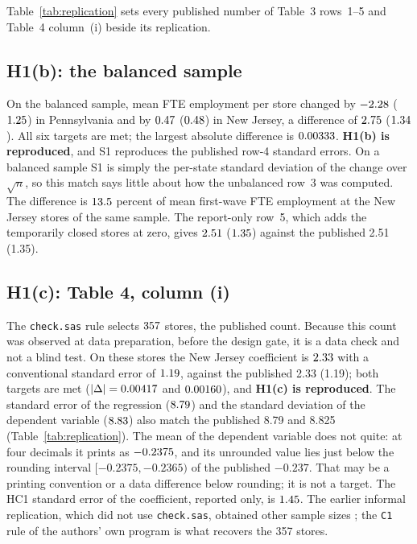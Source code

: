 \documentclass[11pt]{article}
\begin{document}
Table~\ref{tab:replication} sets every published number of Table~3 rows~1--5 and Table~4
column~(i) beside its replication.

\subsection{H1(b): the balanced sample}

On the balanced sample, mean FTE employment per store changed by $-2.28$
($1.25$) in Pennsylvania and by $0.47$ ($0.48$)
in New Jersey, a difference of $2.75$ ($1.34$). All six targets are
met; the largest absolute difference is $0.00333$. \textbf{H1(b) is reproduced}, and
S1 reproduces the published row-4 standard errors. On a balanced sample S1 is simply the
per-state standard deviation of the change over $\sqrt n$, so this match says little about
how the unbalanced row~3 was computed. The difference is $13.5$ percent of
mean first-wave FTE employment at the New Jersey stores of the same sample. The report-only
row~5, which adds the temporarily closed stores at zero, gives $2.51$ ($1.35$)
against the published 2.51 (1.35).

\subsection{H1(c): Table 4, column (i)}

The \texttt{check.sas} rule selects $357$ stores, the published count. Because this count
was observed at data preparation, before the design gate, it is a data check and not a blind
test. On these stores the New Jersey coefficient is $2.33$ with a conventional standard
error of $1.19$, against the published 2.33 (1.19); both targets are met
($|\Delta| = 0.00417$ and $0.00160$), and \textbf{H1(c) is reproduced}.
The standard error of the regression ($8.79$) and the standard deviation of the
dependent variable ($8.83$) also match the published 8.79 and 8.825
(Table~\ref{tab:replication}).
The mean of the dependent variable does not quite: at four decimals it prints as
$-0.2375$, and its unrounded value lies just below the rounding interval
$[-0.2375, -0.2365)$ of the published $-0.237$. That may be a printing convention or a data
difference below rounding; it is not a target. The HC1 standard error of the coefficient,
reported only, is $1.45$. The earlier informal replication, which did not use
\texttt{check.sas}, obtained other sample sizes \citep{mamula2021replicating}; the
\texttt{C1} rule of the authors' own program is what recovers the 357 stores.
\end{document}
